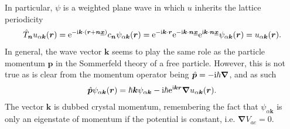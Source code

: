In particular, $\psi$ is a weighted plane wave in which $u$ inherits the lattice periodicity
\begin{align}
    \hat T_{\bm n} u_{\alpha{\bm k}}({\bm r})
    =
    \mathrm e^{-\mathrm i{\bm k}\cdot \left( {\bm r}+{\bm n}\underline{\bm x} \right)}c_{\bm n}\psi_{\alpha{\bm k}}({\bm r})
    =
    \mathrm e^{-\mathrm i{\bm k}\cdot {\bm r}}\mathrm e^{-\mathrm i{\bm k}\cdot {\bm n}\underline{\bm x}}\mathrm e^{\mathrm i{\bm k}\cdot {\bm n}\underline{\bm x}}\psi_{\alpha{\bm k}}({\bm r})
    =
    u_{\alpha{\bm k}}({\bm r}).
\end{align}
In general, the wave vector $\bm k$ seems to play the same role as the particle momentum $\bm p$ in the Sommerfeld theory of a free particle.
However, this is not true as is clear from the momentum operator being $\hat{\bm p}=-\mathrm i\hbar\bm \nabla$, and as such
\begin{align}
  \hat{\bm p}\psi_{\alpha{\bm k}}({\bm r}) = \hbar{\bm k}\psi_{\alpha{\bm k}} - \mathrm i\hbar\mathrm e^{\mathrm i{\bm k}{\bm r}}\bm\nabla u_{\alpha \bm k}(\bm r).
\end{align}
The vector ${\bm k}$ is dubbed crystal momentum, remembering the fact that $\psi_{\alpha{\bm k}}$ is only an eigenstate of momentum if the potential is constant, i.e. $\bm\nabla V_{ae}=0$.

